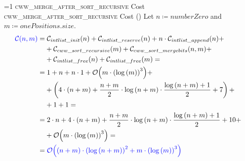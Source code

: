 \setcounter{cwwmergeaftersortrecursivecostcounter}{1}
\newcommand{\cwwmergeaftersortrecursivecostframe}{%
    \ifnum\value{cwwmergeaftersortrecursivecostcounter}=1
        \textsc{cww\_merge\_after\_sort\_recursive} Cost%
    \else
        \textsc{cww\_merge\_after\_sort\_recursive} Cost (\thecwwmergeaftersortrecursivecostcounter)%
    \fi
}
            \begin{frame}{\cwwmergeaftersortrecursivecostframe}
                \footnotesize
                Let $n \coloneqq numberZero$ and $m \coloneqq onePositions.size$.
                \begin{align*}
                    \textcolor{blue}{\mathcal{C}{\left(n, m\right)}} = & \; \mathcal{C}_{intlist\_init}{\left(n\right)} + \mathcal{C}_{intlist\_reserve}{\left(n\right)} + n \cdot \mathcal{C}_{intlist\_append}{\left(n\right)} + \\
                    & + \mathcal{C}_{cww\_sort\_recursive}{\left(m\right)} + \mathcal{C}_{cww\_sort\_mergebits}{\left(n, m\right)} + \\
                    & + \mathcal{C}_{intlist\_free}{\left(n\right)} + \mathcal{C}_{intlist\_free}{\left(m\right)} = \\
                    = & \; 1 + n + n \cdot 1 + \mathcal{O}{\left(m \cdot \left(\log{\left(m\right)}\right)^3\right)} + \\
                    & + \left(4 \cdot \left(n + m\right) + \frac{n + m}{2} \cdot \log{\left(n + m\right)} \cdot \frac{\log{\left(n + m\right)} + 1}{2} + 7\right) + \\
                    & + 1 + 1 = \\
                    = & \; 2 \cdot n + 4 \cdot \left(n + m\right) + \frac{n + m}{2} \cdot \log{\left(n + m\right)} \cdot \frac{\log{\left(n + m\right)} + 1}{2} + 10 + \\
                    & + \mathcal{O}{\left(m \cdot \left(\log{\left(m\right)}\right)^3\right)} = \\
                    = & \; \textcolor{blue}{\mathcal{O}{\left(\left(n + m\right) \cdot \left(\log{\left(n + m\right)}\right)^2 + m \cdot \left(\log{\left(m\right)}\right)^3\right)}}
                \end{align*}
            \end{frame}

